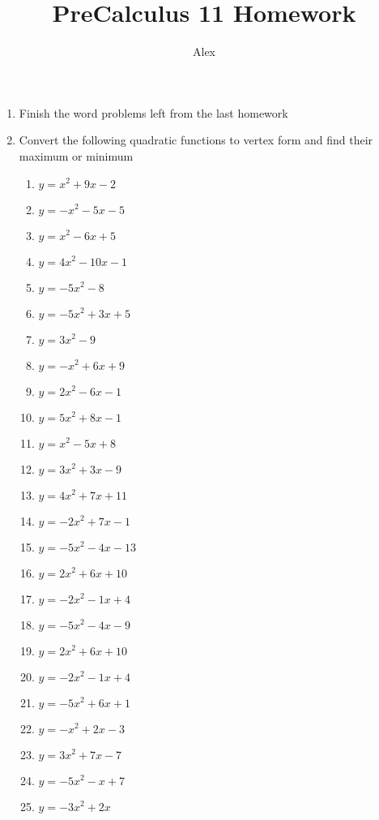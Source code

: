 \documentclass{article}
\title{PreCalculus 11 Homework}
\author{Alex}
\begin{document}
\maketitle
\begin{enumerate}
    \item Finish the word problems left from the last homework
    \item Convert the following quadratic functions to vertex 
      form and find their maximum or minimum
    \begin{enumerate}[label=(\arabic*)]
        \item $y = x^2+9x-2$
        \item $y = -x^2-5x-5$
        \item $y = x^2-6x+5$
        \item $y = 4x^2-10x-1$
        \item $y = -5x^2-8$
        \item $y = -5x^2+3x+5$
        \item $y = 3x^2-9$
        \item $y = -x^2+6x+9$
        \item $y = 2x^2-6x-1$
        \item $y = 5x^2+8x-1$
        \item $y = x^2-5x+8$
        \item $y = 3x^2+3x-9$
        \item $y = 4x^2+7x+11$
        \item $y = -2x^2+7x-1$
        \item $y = -5x^2-4x-13$
        \item $y = 2x^2+6x+10$
        \item $y = -2x^2-1x+4$
        \item $y = -5x^2-4x-9$
        \item $y = 2x^2+6x+10$
        \item $y = -2x^2-1x+4$
        \item $y = -5x^2+6x+1$
        \item $y = -x^2+2x-3$
        \item $y = 3x^2+7x-7$
        \item $y = -5x^2-x+7$
        \item $y = -3x^2+2x$
    \end{enumerate}
\end{enumerate}
\end{document}
